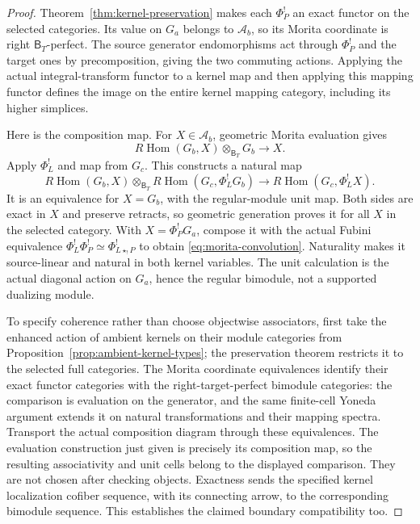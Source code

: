 \documentclass[11pt]{article}
\theoremstyle{definition}
\theoremstyle{remark}
\newcommand{\RHom}{R\operatorname{Hom}}
\begin{document}
\begin{proof}
Theorem~\ref{thm:kernel-preservation} makes each $\Phi_P^!$ an exact
functor on the selected categories.  Its value on $G_a$ belongs to
$\mathcal A_b$, so its Morita coordinate is right $\mathsf B_T$-perfect.
The source generator endomorphisms act through $\Phi_P^!$ and the
target ones by precomposition, giving the two commuting actions.
Applying the actual integral-transform functor to a kernel map and
then applying this mapping functor defines the image on the entire
kernel mapping category, including its higher simplices.

Here is the composition map.  For $X\in\mathcal A_b$, geometric
Morita evaluation gives
\[
 \RHom(G_b,X)\otimes_{\mathsf B_T}G_b\longrightarrow X.
\]
Apply $\Phi_L^!$ and map from $G_c$.  This constructs a natural map
\[
 \RHom(G_b,X)\otimes_{\mathsf B_T}
                     \RHom(G_c,\Phi_L^!G_b)
      \longrightarrow\RHom(G_c,\Phi_L^!X).
\]
It is an equivalence for $X=G_b$, with the regular-module unit map.
Both sides are exact in $X$ and preserve retracts, so geometric
generation proves it for all $X$ in the selected category.  With
$X=\Phi_P^!G_a$, compose it with the actual Fubini equivalence
$\Phi_L^!\Phi_P^!\simeq\Phi_{L\star_!P}^!$ to obtain
\eqref{eq:morita-convolution}.  Naturality makes it source-linear and
natural in both kernel variables.  The unit calculation is the
actual diagonal action on $G_a$, hence the regular bimodule, not a
supported dualizing module.

To specify coherence rather than choose objectwise associators,
first take the enhanced action of ambient kernels on their module
categories from Proposition~\ref{prop:ambient-kernel-types}; the
preservation theorem restricts it to the selected full categories.
The Morita coordinate equivalences identify their exact functor
categories with the right-target-perfect bimodule categories: the
comparison is evaluation on the generator, and the same finite-cell
Yoneda argument extends it on natural transformations and their
mapping spectra.  Transport the actual composition diagram through
these equivalences.  The evaluation construction just given is
precisely its composition map, so the resulting associativity and
unit cells belong to the displayed comparison.  They are not chosen
after checking objects.  Exactness sends the specified kernel
localization cofiber sequence, with its connecting arrow, to the
corresponding bimodule sequence.  This establishes the claimed
boundary compatibility too.
\end{proof}
\end{document}
